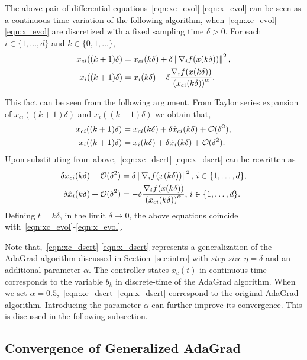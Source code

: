 The above pair of differential equations~\eqref{eqn:xc_evol}-\eqref{eqn:x_evol} can be seen as a continuous-time variation of the following algorithm, when~\eqref{eqn:xc_evol}-\eqref{eqn:x_evol} are discretized with a fixed sampling time $\delta > 0$. For each $i \in \{1,\ldots,d\}$ and $k \in \{0,1,\ldots\}$,
\begin{align}
    x_{ci}((k+1)\delta) & = x_{ci}(k\delta) + \delta \left\lVert\nabla_i f(x(k\delta))\right\rVert ^2, \label{eqn:xc_dscrt} \\
    x_{i}((k+1)\delta) & = x_{i}(k\delta) - \delta \dfrac{\nabla_i f(x(k\delta))}{\left(x_{ci}(k\delta)\right)^\alpha}.  \label{eqn:x_dscrt}
\end{align}

This fact can be seen from the following argument.
From Taylor series expansion of $x_{ci}((k+1)\delta)$ and $x_{i}((k+1)\delta)$ we obtain that,
\begin{align*}
    x_{ci}((k+1)\delta) & = x_{ci}(k\delta) + \delta \Dot{x}_{ci}(k\delta) + \bigO(\delta^2), \\
    x_{i}((k+1)\delta) & = x_{i}(k\delta) + \delta \Dot{x}_{i}(k\delta) + \bigO(\delta^2).
\end{align*}
Upon substituting from above,~\eqref{eqn:xc_dscrt}-\eqref{eqn:x_dscrt} can be rewritten as
\begin{align*}
    \delta \Dot{x}_{ci}(k\delta) + \bigO(\delta^2) & = \delta \norm{\nabla_i f(x(k\delta))}^2, \, i \in \{1,\ldots,d\}, \\
    \delta \Dot{x}_{i}(k\delta) + \bigO(\delta^2) & = - \delta \dfrac{\nabla_i f(x(k\delta))}{\left(x_{ci}(k\delta)\right)^\alpha}, \, i \in \{1,\ldots,d\}.
\end{align*}
Defining $t=k\delta$, in the limit $\delta \to 0$, the above equations coincide with~\eqref{eqn:xc_evol}-\eqref{eqn:x_evol}. 

Note that,~\eqref{eqn:xc_dscrt}-\eqref{eqn:x_dscrt} represents a generalization of the AdaGrad algorithm discussed in Section~\ref{sec:intro} with {\em step-size} $\eta = \delta$ and an additional parameter $\alpha$. The controller states $x_c(t)$ in continuous-time corresponds to the variable $b_k$ in discrete-time of the AdaGrad algorithm. When we set $\alpha=0.5$,~\eqref{eqn:xc_dscrt}-\eqref{eqn:x_dscrt} correspond to the original AdaGrad algorithm. Introducing the parameter $\alpha$ can further improve its convergence. This is discussed in the following subsection.


\subsection{Convergence of Generalized AdaGrad}
\label{sub:conv_adagrad}

